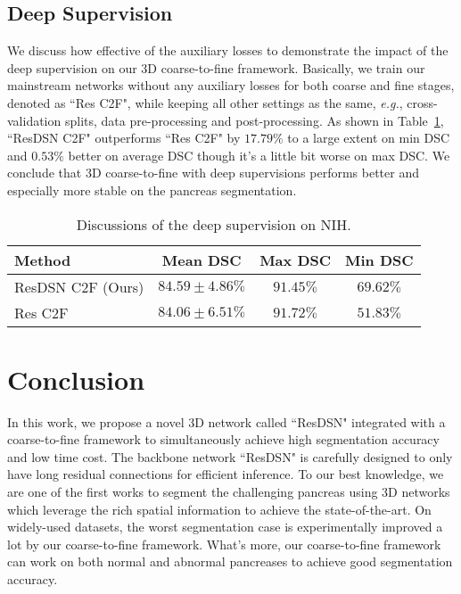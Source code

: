 \documentclass[10pt,twocolumn,letterpaper]{article}
\begin{document}
\subsection{Deep Supervision}
We discuss how effective of the auxiliary losses to demonstrate the impact of the deep supervision on our 3D coarse-to-fine framework. Basically, we train our mainstream networks without any auxiliary losses for both coarse and fine stages, denoted as ``Res C2F", while keeping all other settings as the same, \emph{e.g.}, cross-validation splits, data pre-processing and post-processing. As shown in Table~\ref{Tab:DeepSupervision}, ``ResDSN C2F" outperforms ``Res C2F" by $17.79\%$ to a large extent on min DSC and $0.53\%$ better on average DSC though it's a little bit worse on max DSC. We conclude that 3D coarse-to-fine with deep supervisions performs better and especially more stable on the pancreas segmentation.

\begin{table}[tb]
\footnotesize
\begin{center}
\begin{tabular}{lccc}\toprule
Method           & {Mean DSC}       		& {Max DSC}    		& {Min DSC} \\
\hline
{ResDSN C2F (Ours)}  		& $\bm{84.59\pm{4.86}}\%$ 				& $91.45\%$       	&$\bm{69.62}\%$ \\
{Res C2F} &$84.06\pm{6.51}\%$ 				&$\bm{91.72}\%$			&$51.83\%$ \\
\bottomrule
\end{tabular}
\end{center}
\caption{
    Discussions of the deep supervision on NIH.
}
\vspace{-0.4cm}
\label{Tab:DeepSupervision}
\end{table}

\vspace{-0.3cm}
\section{Conclusion}
In this work, we propose a novel 3D network called ``ResDSN" integrated with a coarse-to-fine framework to simultaneously achieve high segmentation accuracy and low time cost. The backbone network ``ResDSN" is carefully designed to only have long residual connections for efficient inference. To our best knowledge, we are one of the first works to segment the challenging pancreas using 3D networks which leverage the rich spatial information to achieve the state-of-the-art. On widely-used datasets, the worst segmentation case is experimentally improved a lot by our coarse-to-fine framework. What's more, our coarse-to-fine framework can work on both normal and abnormal pancreases to achieve good segmentation accuracy.
\end{document}
